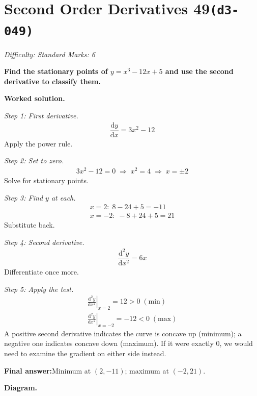\documentclass[11pt]{article}
\newcommand{\question}[1]{\par\medskip\noindent\textbf{#1}\par}
\begin{document}
\section*{Second Order Derivatives 49\quad\small\texttt{(d3-049)}}
\textit{Difficulty: Standard \quad\textbar\quad Marks: 6}

\question{Find the stationary points of \( y = x^3 - 12x + 5 \) and use the second derivative to classify them.}

\textbf{Worked solution.}

\textit{Step 1: First derivative.}
\[\begin{gathered}
\dfrac{\mathrm{d}y}{\mathrm{d}x} = 3x^2 - 12
\end{gathered}\]
Apply the power rule.

\textit{Step 2: Set to zero.}
\[\begin{gathered}
3x^2 - 12 = 0 \;\Rightarrow\; x^2 = 4 \;\Rightarrow\; x = \pm 2
\end{gathered}\]
Solve for stationary points.

\textit{Step 3: Find \( y \) at each.}
\[\begin{gathered}
x = 2: \; 8 - 24 + 5 = -11 \\ x = -2: \; -8 + 24 + 5 = 21
\end{gathered}\]
Substitute back.

\textit{Step 4: Second derivative.}
\[\begin{gathered}
\dfrac{\mathrm{d}^2y}{\mathrm{d}x^2} = 6x
\end{gathered}\]
Differentiate once more.

\textit{Step 5: Apply the test.}
\[\begin{gathered}
\left.\tfrac{\mathrm{d}^2y}{\mathrm{d}x^2}\right|_{x=2} = 12 > 0 \; (\text{min}) \\ \left.\tfrac{\mathrm{d}^2y}{\mathrm{d}x^2}\right|_{x=-2} = -12 < 0 \; (\text{max})
\end{gathered}\]
A positive second derivative indicates the curve is concave up (minimum); a negative one indicates concave down (maximum). If it were exactly \(0\), we would need to examine the gradient on either side instead.

\begin{answerbox}
\textbf{Final answer:}\quad Minimum at \(\displaystyle  (2, -11) \); maximum at \(\displaystyle  (-2, 21) \).
\end{answerbox}
\textbf{Diagram.}
\end{document}
